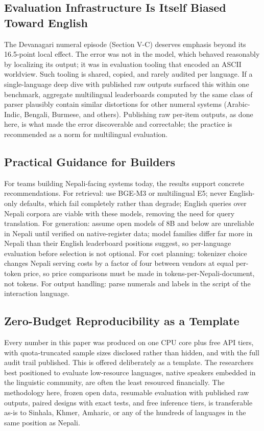 \documentclass[conference]{IEEEtran}
\begin{document}
\subsection{Evaluation Infrastructure Is Itself Biased Toward English}
The Devanagari numeral episode (Section V-C) deserves emphasis beyond its 16.5-point local effect. The error was not in the model, which behaved reasonably by localizing its output; it was in evaluation tooling that encoded an ASCII worldview. Such tooling is shared, copied, and rarely audited per language. If a single-language deep dive with published raw outputs surfaced this within one benchmark, aggregate multilingual leaderboards computed by the same class of parser plausibly contain similar distortions for other numeral systems (Arabic-Indic, Bengali, Burmese, and others). Publishing raw per-item outputs, as done here, is what made the error discoverable and correctable; the practice is recommended as a norm for multilingual evaluation.

\subsection{Practical Guidance for Builders}
For teams building Nepali-facing systems today, the results support concrete recommendations. For retrieval: use BGE-M3 or multilingual E5; never English-only defaults, which fail completely rather than degrade; English queries over Nepali corpora are viable with these models, removing the need for query translation. For generation: assume open models of 8B and below are unreliable in Nepali until verified on native-register data; model families differ far more in Nepali than their English leaderboard positions suggest, so per-language evaluation before selection is not optional. For cost planning: tokenizer choice changes Nepali serving costs by a factor of four between vendors at equal per-token price, so price comparisons must be made in tokens-per-Nepali-document, not tokens. For output handling: parse numerals and labels in the script of the interaction language.

\subsection{Zero-Budget Reproducibility as a Template}
Every number in this paper was produced on one CPU core plus free API tiers, with quota-truncated sample sizes disclosed rather than hidden, and with the full audit trail published. This is offered deliberately as a template. The researchers best positioned to evaluate low-resource languages, native speakers embedded in the linguistic community, are often the least resourced financially. The methodology here, frozen open data, resumable evaluation with published raw outputs, paired designs with exact tests, and free inference tiers, is transferable as-is to Sinhala, Khmer, Amharic, or any of the hundreds of languages in the same position as Nepali.
\end{document}
